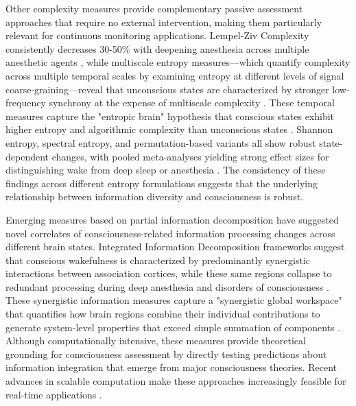 \documentclass[11pt,a4paper]{article}
\begin{document}
Other complexity measures provide complementary passive assessment approaches that require no external intervention, making them particularly relevant for continuous monitoring applications. Lempel-Ziv Complexity consistently decreases 30-50\% with deepening anesthesia across multiple anesthetic agents \citep{Zhang2001, Schartner2015}, while multiscale entropy measures—which quantify complexity across multiple temporal scales by examining entropy at different levels of signal coarse-graining—reveal that unconscious states are characterized by stronger low-frequency synchrony at the expense of multiscale complexity \citep{Liu2019}. These temporal measures capture the "entropic brain" hypothesis that conscious states exhibit higher entropy and algorithmic complexity than unconscious states \citep{Carhart-Harris2014}. Shannon entropy, spectral entropy, and permutation-based variants all show robust state-dependent changes, with pooled meta-analyses yielding strong effect sizes for distinguishing wake from deep sleep or anesthesia \citep{Liu2023, Schartner2015}. The consistency of these findings across different entropy formulations suggests that the underlying relationship between information diversity and consciousness is robust.

Emerging measures based on partial information decomposition \citep{Williams2010, Mediano2022} have suggested novel correlates of consciousness-related information processing changes across different brain states. Integrated Information Decomposition frameworks suggest that conscious wakefulness is characterized by predominantly synergistic interactions between association cortices, while these same regions collapse to redundant processing during deep anesthesia and disorders of consciousness \citep{Luppi2022}. These synergistic information measures capture a "synergistic global workspace" \citep{Luppi2022} that quantifies how brain regions combine their individual contributions to generate system-level properties that exceed simple summation of components \citep{Mediano2022}. Although computationally intensive, these measures provide theoretical grounding for consciousness assessment by directly testing predictions about information integration that emerge from major consciousness theories. Recent advances in scalable computation make these approaches increasingly feasible for real-time applications \citep{Rosas2024}.
\end{document}
